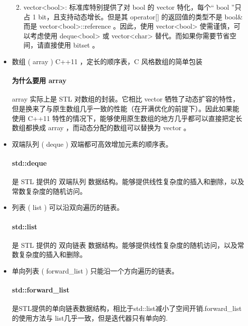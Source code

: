 \documentclass[UTF8]{ctexart}
\begin{document}
\begin{itemize}
\begin{enumerate}[(1)]
\begin{lstlisting}
\end{lstlisting}
\item vector<bool>: 
标准库特别提供了对 bool 的 vector 特化，每个“ bool ”只占 1 bit，且支持动态增长。但是其 operator[] 的返回值的类型不是 bool\& 而是 vector<bool>::reference 。因此，使用 vector<bool> 使需谨慎，可以考虑使用 deque<bool> 或 vector<char> 替代。而如果你需要节省空间，请直接使用 bitset 。
\end{enumerate}


\item 数组 ( array ) C++11 ，定长的顺序表，C 风格数组的简单包装
\paragraph{为什么要用 array}
array 实际上是 STL 对数组的封装。它相比 vector 牺牲了动态扩容的特性，但是换来了与原生数组几乎一致的性能（在开满优化的前提下）。因此如果能使用 C++11 特性的情况下，能够使用原生数组的地方几乎都可以直接把定长数组都换成 array ，而动态分配的数组可以替换为 vector 。


\item 双端队列 ( deque ) 双端都可高效增加元素的顺序表。
    \paragraph{std::deque}
    是 STL 提供的 双端队列 数据结构。能够提供线性复杂度的插入和删除，以及常数复杂度的随机访问。

\item 列表 ( list ) 可以沿双向遍历的链表。
    \paragraph{std::list}
    是 STL 提供的 双向链表 数据结构。能够提供线性复杂度的随机访问，以及常数复杂度的插入和删除。

\item 单向列表 ( forward\_list ) 只能沿一个方向遍历的链表。
    \paragraph{std::forward\_list}
    是STL提供的单向链表数据结构，相比于std::list减小了空间开销.forward\_list的使用方法与 list几乎一致，但是迭代器只有单向的.
\end{itemize}
\end{document}
